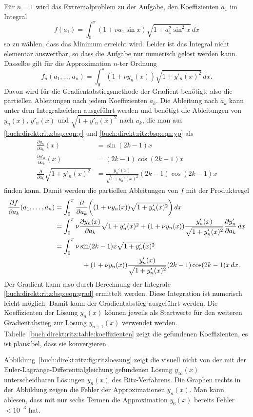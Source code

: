 Für $n=1$ wird das Extremalproblem zu der Aufgabe, den Koeffizienten $a_1$
im Integral
\[
f(a_1)
=
\int_0^\pi (1+\nu a_1\sin x)\sqrt{1+a_1^2\sin^2 x}\,dx
\]
so zu wählen, dass das Minimum erreicht wird.
Leider ist das Integral nicht elementar auswertbar, so dass die Aufgabe
nur numerisch gelöst werden kann.
Dasselbe gilt für die Approximation $n$-ter Ordnung
\[
f_n(a_1,\dots,a_n)
=
\int_0^\pi
(1+\nu y_n(x))
\sqrt{1+y'_n(x)^2}
\,dx.
\]
Davon wird für die Gradientabstiegsmethode der Gradient benötigt,
also die partiellen Ableitungen nach jedem Koeffizienten $a_k$.
Die Ableitung nach $a_k$ kann unter dem Integralzeichen ausgeführt werden
und benötigt die Ableitungen von $y_n(x)$, $y'_n(x)$ und $\sqrt{1+y'_n(x)^2}$
nach $a_k$, die man aus
\eqref{buch:direkt:ritz:bsp:eqn:y}
und
\eqref{buch:direkt:ritz:bsp:eqn:yp}
als
\begin{align*}
\frac{\partial y_n}{\partial a_k}(x)
&=
\sin (2k-1) x
\\
\frac{\partial y'_n}{\partial a_k}(x)
&=
(2k-1)\cos(2k-1)x
\\
\frac{\partial}{\partial a_k}\sqrt{1+y'_n(x)^2}
&=
\frac{y_n'(x)}{\sqrt{1+y_n'(x)^2}}(2k-1)\cos(2k-1)x
\end{align*}
finden kann.
Damit werden die partiellen Ableitungen von $f$ mit der Produktregel
\begin{align}
\frac{\partial f}{\partial a_k}(a_1,\dots,a_n)
&=
\int_0^\pi
\frac{\partial}{\partial a_k}\biggl(
(1+\nu y_n(x))
\sqrt{1+y_n'(x)^2}
\biggr)\,dx
\notag
\\
&=
\int_0^\pi 
\nu
\frac{\partial y_n(x)}{\partial a_k}\sqrt{1+y_n'(x)^2}
+
(1+\nu y_n(x))
\frac{y_n'(x)}{\sqrt{1+y_n'(x)^2}}\frac{\partial y_n'}{\partial a_k}
\,dx
\notag
\\
&=
\int_0^\pi
\nu \sin(2k-1)x \sqrt{1+y_n'(x)^2}
\notag
\\
&\qquad\qquad
+
(1+\nu y_n(x))\frac{y_n'(x)}{\sqrt{1+y_n'(x)^2}}(2k-1)\cos(2k-1)x
\,dx.
\label{buch:direkt:ritz:bsp:eqn:grad}
\end{align}
Der Gradient kann also durch Berechnung der Integrale
\eqref{buch:direkt:ritz:bsp:eqn:grad} ermittelt werden.
Diese Integration ist numerisch leicht möglich.
Damit kann der Gradientabstieg ausgeführt werden.
Die Koeffizienten der Lösung $y_n(x)$ können jeweils als Startwerte
für den weiteren Gradientabstieg zur Lösung $y_{n+1}(x)$ verwendet
werden.
Tabelle~\ref{buch:direkt:ritz:table:koeffizienten} zeigt die gefundenen
Koeffizienten, es ist plausibel, dass sie konvergieren.

Abbildung~\ref{buch:direkt:ritz:fig:ritzloesung} zeigt die visuell
nicht von der mit der Euler-Lagrange-Differential\-glei\-chung
gefundenen Lösung $y_\infty(x)$ unterscheidbaren Lösungen $y_n(x)$ 
des Ritz-Verfahrens.
Die Graphen rechts in der Abbildung zeigen die Fehler der Approximationen
$y_n(x)$.
Man kann ablesen, dass mit nur sechs Termen die Approximation
$y_6(x)$ bereits Fehler $<10^{-3}$ hat.


